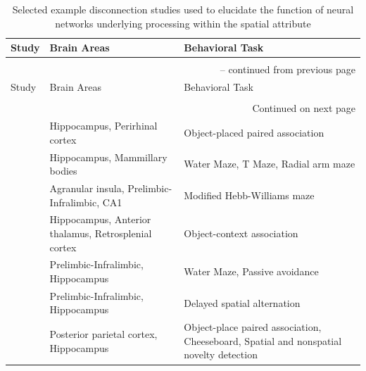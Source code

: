 \documentclass[doc, longtable]{apa6}
\begin{document}
\begin{landscape}
\begin{longtable}{p{8cm}p{5cm}p{8cm}}
\caption{Selected example disconnection studies used to elucidate the function of neural networks underlying processing within the spatial attribute}\label{tab1} \\
\hline
Study & Brain Areas & Behavioral Task \\
\hline
\\
\endfirsthead
%
\multicolumn{3}{r}{-- continued from previous page} \\
\hline
Study & Brain Areas & Behavioral Task \\
\hline
\\
\endhead
\hline \multicolumn{3}{r}{{Continued on next page}} \\ 
\hline
\endfoot
%
\hline
\endlastfoot
\cite{jo2010disconnection} & Hippocampus, \newline Perirhinal cortex & Object-placed paired association\\[20pt]
\cite{vann2011selective} & Hippocampus, \newline Mammillary bodies &Water Maze, \newline T Maze, \newline Radial arm maze\\[20pt]
\cite{churchwell2010prefrontal} & Agranular insula, \newline Prelimbic-Infralimbic, \newline CA1 & Modified Hebb-Williams maze\\[20pt]
\cite{dumont2010fornix} & Hippocampus, \newline Anterior thalamus, \newline Retrosplenial cortex & Object-context association\\[20pt]
\cite{wang2008reversible} & Prelimbic-Infralimbic, \newline Hippocampus&Water Maze, \newline Passive avoidance\\[20pt]
\cite{wang2006disconnection} & Prelimbic-Infralimbic, \newline Hippocampus & Delayed spatial alternation\\[20pt]
\cite{Rogers2007a} & Posterior parietal cortex, \newline Hippocampus & Object-place paired association, \newline Cheeseboard, \newline Spatial and nonspatial novelty detection\\[20pt]

\end{longtable}
\end{landscape}
\end{document}
